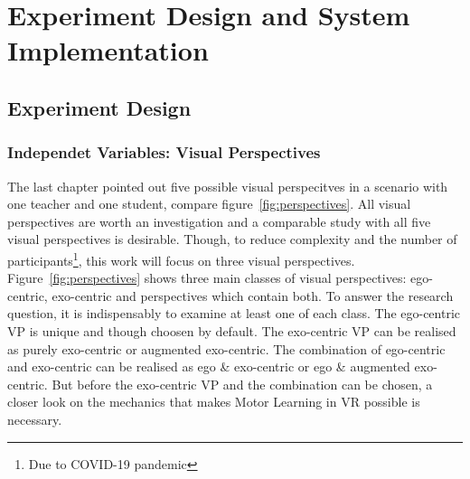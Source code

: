 \chapter{Experiment Design and System Implementation}
\label{chapter:studysetting_conduction}
\section{Experiment Design}
\label{section:study}

\subsection{Independet Variables: Visual Perspectives}
The last chapter pointed out five possible visual perspecitves in a scenario with one teacher and one student, compare figure~\ref{fig:perspectives}. All visual perspectives are worth an investigation and a comparable study with all five visual perspectives is desirable. Though, to reduce complexity and the number of participants\footnote{Due to COVID-19 pandemic}, this work will focus on three visual perspectives.\\
Figure~\ref{fig:perspectives} shows three main classes of visual perspectives: ego-centric, exo-centric and perspectives which contain both. To answer the research question, it is indispensably to examine at least one of each class. The ego-centric VP is unique and though choosen by default. The exo-centric VP can be realised as purely exo-centric or augmented exo-centric. The combination of ego-centric and exo-centric can be realised as ego \& exo-centric or ego \& augmented exo-centric. But before the exo-centric VP and the combination can be chosen, a closer look on the mechanics that makes Motor Learning in VR possible is necessary.

